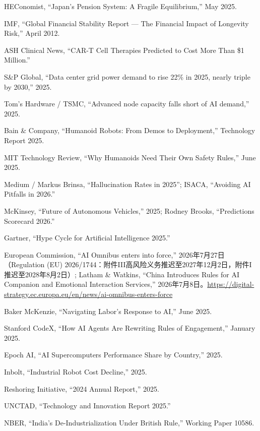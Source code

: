 \documentclass[11pt,a4paper]{ctexart}
\begin{document}
\noindent [46] HEConomist, ``Japan's Pension System: A Fragile Equilibrium,'' May 2025.

\noindent [47] IMF, ``Global Financial Stability Report --- The Financial Impact of Longevity Risk,'' April 2012.

\noindent [48] ASH Clinical News, ``CAR-T Cell Therapies Predicted to Cost More Than \$1 Million.''

\noindent [49] S\&P Global, ``Data center grid power demand to rise 22\% in 2025, nearly triple by 2030,'' 2025.

\noindent [50] Tom's Hardware / TSMC, ``Advanced node capacity falls short of AI demand,'' 2025.

\noindent [51] Bain \& Company, ``Humanoid Robots: From Demos to Deployment,'' Technology Report 2025.

\noindent [52] MIT Technology Review, ``Why Humanoids Need Their Own Safety Rules,'' June 2025.

\noindent [53] Medium / Markus Brinsa, ``Hallucination Rates in 2025''; ISACA, ``Avoiding AI Pitfalls in 2026.''

\noindent [54] McKinsey, ``Future of Autonomous Vehicles,'' 2025; Rodney Brooks, ``Predictions Scorecard 2026.''

\noindent [55] Gartner, ``Hype Cycle for Artificial Intelligence 2025.''

\noindent [56] European Commission, ``AI Omnibus enters into force,'' 2026年7月27日（Regulation (EU) 2026/1744：附件III高风险义务推迟至2027年12月2日，附件I推迟至2028年8月2日）; Latham \& Watkins, ``China Introduces Rules for AI Companion and Emotional Interaction Services,'' 2026年7月8日。\url{https://digital-strategy.ec.europa.eu/en/news/ai-omnibus-enters-force}

\noindent [57] Baker McKenzie, ``Navigating Labor's Response to AI,'' June 2025.

\noindent [58] Stanford CodeX, ``How AI Agents Are Rewriting Rules of Engagement,'' January 2025.

\noindent [59] Epoch AI, ``AI Supercomputers Performance Share by Country,'' 2025.

\noindent [60] Inbolt, ``Industrial Robot Cost Decline,'' 2025.

\noindent [61] Reshoring Initiative, ``2024 Annual Report,'' 2025.

\noindent [62] UNCTAD, ``Technology and Innovation Report 2025.''

\noindent [63] NBER, ``India's De-Industrialization Under British Rule,'' Working Paper 10586.
\end{document}
